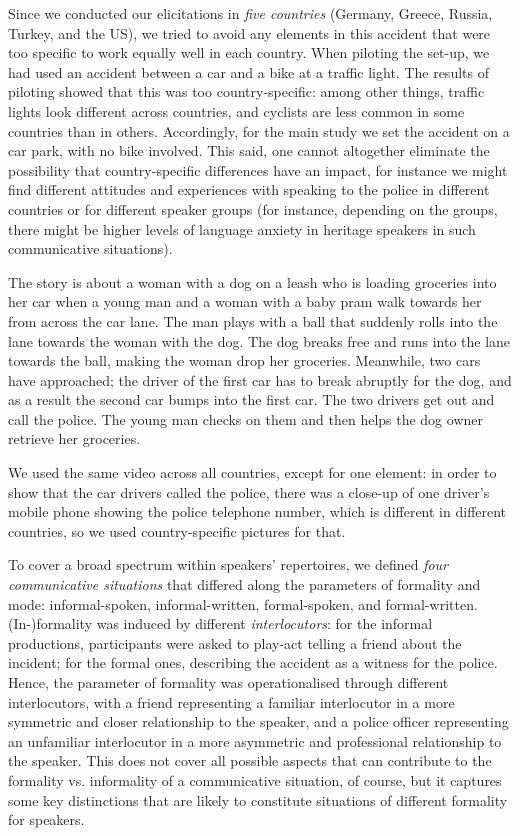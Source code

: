 \documentclass[output=paper,colorlinks,citecolor=brown]{langscibook}
\begin{document}
Since we conducted our elicitations in \textit{five countries} (Germany, Greece, Russia, Turkey, and the US), we tried to avoid any elements in this accident that were too specific to work equally well in each country. When piloting the set-up, we had used an accident between a car and a bike at a traffic light. The results of piloting showed that this was too country-specific: among other things, traffic lights look different across countries, and cyclists are less common in some countries than in others. Accordingly, for the main study we set the accident on a car park, with no bike involved. This said, one cannot altogether eliminate the possibility that country-specific differences have an impact, for instance we might find different attitudes and experiences with speaking to the police in different countries or for different speaker groups (for instance, depending on the groups, there might be higher levels of language anxiety in heritage speakers in such communicative situations).

The story is about a woman with a dog on a leash who is loading groceries into her car when a young man and a woman with a baby pram walk towards her from across the car lane. The man plays with a ball that suddenly rolls into the lane towards the woman with the dog. The dog breaks free and runs into the lane towards the ball, making the woman drop her groceries. Meanwhile, two cars have approached; the driver of the first car has to break abruptly for the dog, and as a result the second car bumps into the first car. The two drivers get out and call the police. The young man checks on them and then helps the dog owner retrieve her groceries.

We used the same video across all countries, except for one element: in order to show that the car drivers called the police, there was a close-up of one driver’s mobile phone showing the police telephone number, which is different in different countries, so we used country-specific pictures for that.

To cover a broad spectrum within speakers’ repertoires, we defined \textit{four communicative situations} that differed along the parameters of formality and mode: informal-spoken, informal-written, formal-spoken, and formal-written. \mbox{(In-)}for\-mal\-i\-ty was induced by different \textit{interlocutors}: for the informal productions, participants were asked to play-act telling a friend about the incident; for the formal ones, describing the accident as a witness for the police. Hence, the parameter of formality was operationalised through different interlocutors, with a friend representing a familiar interlocutor in a more symmetric and closer relationship to the speaker, and a police officer representing an unfamiliar interlocutor in a more asymmetric and professional relationship to the speaker. This does not cover all possible aspects that can contribute to the formality vs. informality of a communicative situation, of course, but it captures some key distinctions that are likely to constitute situations of different formality for speakers.
\end{document}
